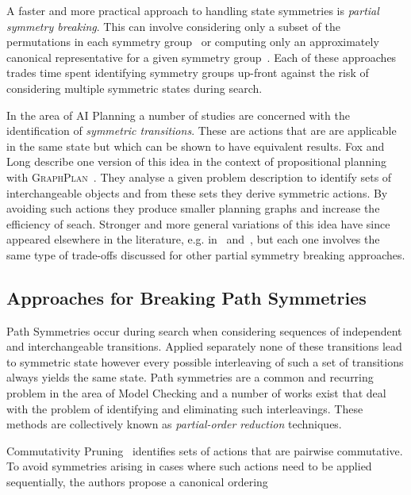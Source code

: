 A faster and more practical approach to handling state symmetries is \emph{partial symmetry breaking}.
This can involve considering only a subset of the permutations in each symmetry group~\citep{crawford96}
or computing only an approximately canonical representative for a given symmetry group~\citep{pochter11}.
Each of these approaches trades time spent identifying symmetry groups up-front against the risk
of considering multiple symmetric states during search.

In the area of AI Planning a number of studies are concerned with the identification of 
\emph{symmetric transitions}. These are  actions that are are applicable in the same state but which 
can be shown to have equivalent results. 
Fox and Long describe one version of this idea in the context of propositional
planning with \textsc{GraphPlan}~\citep{fox99,fox02}. They analyse a given problem description to 
identify sets of interchangeable objects and from these sets they derive symmetric actions. 
By avoiding such actions they produce smaller planning graphs and increase the efficiency of seach. 
Stronger and more general variations of this idea have since appeared elsewhere in the literature, e.g. 
in~\citep{rintannen03} and~\citep{pochter11}, but each one involves the same type of trade-offs
discussed for other partial symmetry breaking approaches.

\subsection{Approaches for Breaking Path Symmetries}
\label{cha::lit::symmetry::por}
Path Symmetries occur during search when considering sequences of independent and interchangeable
transitions. Applied separately none of these transitions lead to symmetric state however every 
possible interleaving of such a set of transitions always yields the same state. Path symmetries
are a common and recurring problem in the area of Model Checking and a number of works exist 
that deal with the problem of identifying and eliminating such interleavings. 
These methods are collectively known as \emph{partial-order reduction} techniques. 

\item Commutativity Pruning~\cite{haslum00} identifies sets of actions that are 
pairwise commutative. To avoid symmetries arising in cases where such actions
need to be applied sequentially, the authors propose a canonical ordering 
\item  



